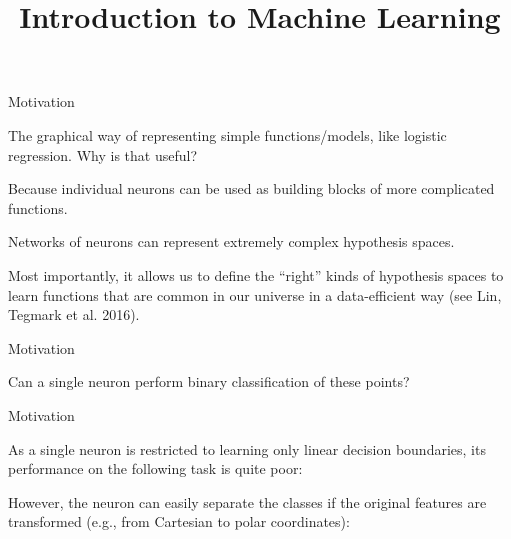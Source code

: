 \documentclass[11pt,compress,t,notes=noshow, xcolor=table]{beamer}
\title{Introduction to Machine Learning}
\begin{document}



\begin{framei}{Motivation}
\item The graphical way of representing simple functions/models, like logistic regression. Why is that useful?
\item Because individual neurons can be used as building blocks of more complicated functions.
\item Networks of neurons can represent extremely complex hypothesis spaces.
\item Most importantly, it allows us to define the \enquote{right} kinds of hypothesis spaces to learn functions that are %
common in our universe in a data-efficient way (see Lin, Tegmark et al. 2016).
\end{framei}


\begin{framei}{Motivation}
\item Can a single neuron perform binary classification of these points?
\end{framei}


\begin{framei}{Motivation}
\item As a single neuron is restricted to learning only linear decision boundaries, its performance on the following task is quite poor:
\item However, the neuron can easily separate the classes if the original features are transformed (e.g., from Cartesian to polar coordinates): 
\end{framei}
\end{document}
